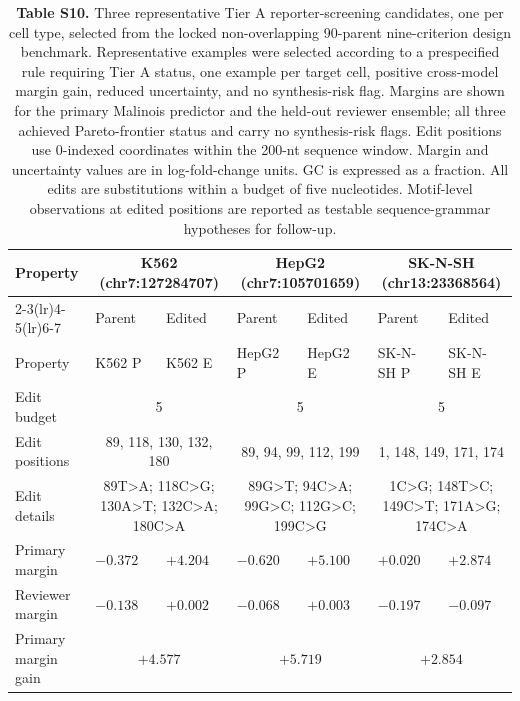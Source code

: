 \documentclass[10pt,a4paper]{article}
\begin{document}
\begin{landscape}
\begin{longtable}{p{2.2cm}p{2.0cm}p{2.0cm}p{2.0cm}p{2.0cm}p{2.0cm}p{2.0cm}}
\caption{\textbf{Table S10.} Three representative Tier A reporter-screening candidates, one per cell
type, selected from the locked non-overlapping 90-parent nine-criterion design benchmark.
Representative examples were selected according to a prespecified rule requiring Tier A
status, one example per target cell, positive cross-model margin gain, reduced
uncertainty, and no synthesis-risk flag. Margins are shown
for the primary Malinois predictor and the held-out reviewer ensemble; all three
achieved Pareto-frontier status and carry no synthesis-risk flags. Edit positions use
0-indexed coordinates within the 200-nt sequence window. Margin and uncertainty values
are in log-fold-change units. GC is expressed as a fraction. All edits are
substitutions within a budget of five nucleotides. Motif-level observations at edited
positions are reported as testable sequence-grammar hypotheses for follow-up.}\label{tab:S10}\\
\toprule
Property & \multicolumn{2}{c}{K562 (chr7:127284707)} & \multicolumn{2}{c}{HepG2 (chr7:105701659)} & \multicolumn{2}{c}{SK-N-SH (chr13:23368564)} \\
\cmidrule(lr){2-3}\cmidrule(lr){4-5}\cmidrule(lr){6-7}
& Parent & Edited & Parent & Edited & Parent & Edited \\
\midrule
\endfirsthead
\toprule
Property & K562 P & K562 E & HepG2 P & HepG2 E & SK-N-SH P & SK-N-SH E \\
\midrule
\endhead
Edit budget & \multicolumn{2}{c}{5} & \multicolumn{2}{c}{5} & \multicolumn{2}{c}{5} \\
Edit positions & \multicolumn{2}{c}{\small 89, 118, 130, 132, 180} & \multicolumn{2}{c}{\small 89, 94, 99, 112, 199} & \multicolumn{2}{c}{\small 1, 148, 149, 171, 174} \\
Edit details & \multicolumn{2}{c}{\small 89T>A; 118C>G; 130A>T; 132C>A; 180C>A} & \multicolumn{2}{c}{\small 89G>T; 94C>A; 99G>C; 112G>C; 199C>G} & \multicolumn{2}{c}{\small 1C>G; 148T>C; 149C>T; 171A>G; 174C>A} \\
\addlinespace
Primary margin & $-0.372$ & $+4.204$ & $-0.620$ & $+5.100$ & $+0.020$ & $+2.874$ \\
Reviewer margin & $-0.138$ & $+0.002$ & $-0.068$ & $+0.003$ & $-0.197$ & $-0.097$ \\
Primary margin gain & \multicolumn{2}{c}{$+4.577$} & \multicolumn{2}{c}{$+5.719$} & \multicolumn{2}{c}{$+2.854$} \\

\end{longtable}
\end{landscape}
\end{document}
